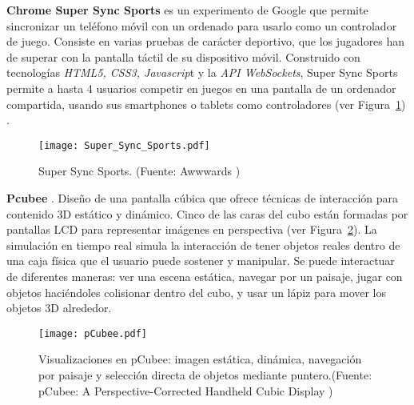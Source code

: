 \textbf{Chrome Super Sync Sports} \cite{Awwwards} es un experimento de Google que permite sincronizar un teléfono móvil con un ordenado para usarlo como un controlador de juego. Consiste en varias pruebas de carácter deportivo, que los jugadores han de superar con la pantalla táctil de su dispositivo móvil. Construido con tecnologías \emph{HTML5, CSS3, Javascrip}t y la \emph{API WebSockets}, Super Sync Sports permite a hasta 4 usuarios competir en juegos en una pantalla de un ordenador compartida, usando sus smartphones o tablets como controladores (ver Figura~\ref{fig:Awwwards}) .

\begin{figure}[!h]
\begin{center}
\texttt{[image: Super\_Sync\_Sports.pdf]}
\caption{Super Sync Sports. (Fuente: Awwwards \cite{Awwwards})}
\label{fig:Awwwards}
\end{center}
\end{figure}


\textbf{Pcubee} \cite{pCubee}. Diseño de una pantalla cúbica que ofrece técnicas de interacción para contenido 3D estático y dinámico. Cinco de las caras del cubo están formadas por pantallas LCD para representar imágenes en perspectiva (ver Figura~\ref{fig:pCubee}). La simulación en tiempo real simula la interacción de tener objetos reales dentro de una caja física que el usuario puede sostener y manipular. Se puede interactuar de diferentes maneras: ver una escena estática, navegar por un paisaje, jugar con objetos haciéndoles colisionar dentro del cubo, y usar un lápiz para mover los objetos 3D alrededor.

\begin{figure}[!h]
\begin{center}
\texttt{[image: pCubee.pdf]}
\caption{Visualizaciones en pCubee: imagen estática, dinámica, navegación por paisaje y selección directa de objetos mediante puntero.(Fuente: pCubee: A Perspective-Corrected Handheld Cubic Display \cite{pCubee})}
\label{fig:pCubee}
\end{center}
\end{figure}








